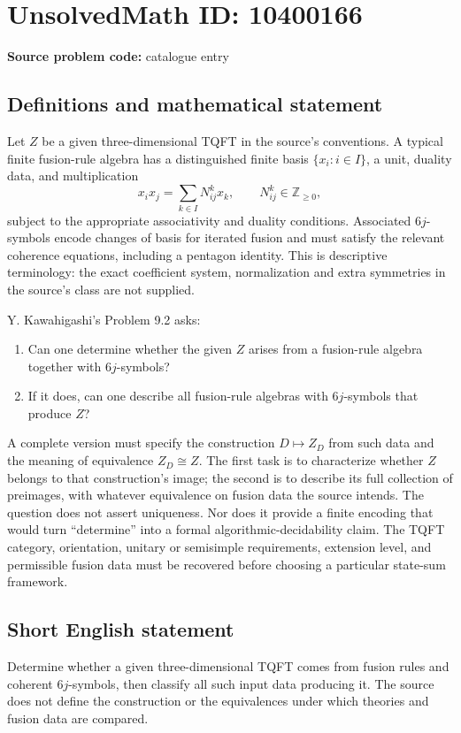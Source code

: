 \documentclass[11pt]{article}
\newcommand{\Z}{\mathbb{Z}}
\begin{document}
\section*{UnsolvedMath ID: 10400166}
\textbf{Source problem code:} catalogue entry
\subsection{Definitions and mathematical statement}
Let \(Z\) be a given three-dimensional TQFT in the source's conventions. A typical finite fusion-rule algebra has a distinguished finite basis \(\{x_i:i\in I\}\), a unit, duality data, and multiplication
\[
 x_i x_j=\sum_{k\in I}N_{ij}^{k}x_k,
 \qquad N_{ij}^{k}\in\Z_{\ge0},
\]
subject to the appropriate associativity and duality conditions. Associated \(6j\)-symbols encode changes of basis for iterated fusion and must satisfy the relevant coherence equations, including a pentagon identity. This is descriptive terminology: the exact coefficient system, normalization and extra symmetries in the source's class are not supplied.

Y. Kawahigashi's Problem 9.2 asks:
\begin{enumerate}
\item Can one determine whether the given \(Z\) arises from a fusion-rule algebra together with \(6j\)-symbols?
\item If it does, can one describe all fusion-rule algebras with \(6j\)-symbols that produce \(Z\)?
\end{enumerate}
A complete version must specify the construction \(D\mapsto Z_D\) from such data and the meaning of equivalence \(Z_D\cong Z\). The first task is to characterize whether \(Z\) belongs to that construction's image; the second is to describe its full collection of preimages, with whatever equivalence on fusion data the source intends. The question does not assert uniqueness. Nor does it provide a finite encoding that would turn ``determine'' into a formal algorithmic-decidability claim. The TQFT category, orientation, unitary or semisimple requirements, extension level, and permissible fusion data must be recovered before choosing a particular state-sum framework.
\subsection{Short English statement}
Determine whether a given three-dimensional TQFT comes from fusion rules and coherent \(6j\)-symbols, then classify all such input data producing it. The source does not define the construction or the equivalences under which theories and fusion data are compared.
\end{document}
